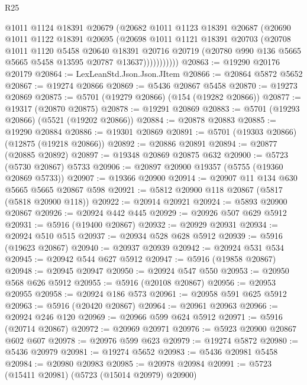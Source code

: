 \begin{lexlean}{R25}
\begin{coremodule}
                @1011
                @1124
                @18391
                @20679
                (@20682
                  @1011
                  @1123
                  @18391
                  @20687
                  (@20690
                    @1011
                    @1122
                    @18391
                    @20695
                    (@20698
                      @1011
                      @1121
                      @18391
                      @20703
                      (@20708
                        @1011
                        @1120
                        @5458
                        @20640
                        @18391
                        @20716
                        @20719
                        (@20780 @990 @136 @5665 @5665 @5458 @13595 @20787 @13637)))))))))))
@20863 := @19290 @20176 @20179
@20864 := LexLeanStd.Json.Json.JItem
@20866 := @20864 @5872 @5652
@20867 := @19274 @20866
@20869 := @5436 @20867 @5458
@20870 := @19273 @20869
@20875 := @5701 (@19279 @20866) (@154 (@19282 @20866))
@20877 := @19317 (@20870 @20875)
@20878 := @19291 @20869
@20883 := @5701 (@19293 @20866) (@5521 (@19202 @20866))
@20884 := @20878 @20883
@20885 := @19290 @20884
@20886 := @19301 @20869
@20891 := @5701 (@19303 @20866) (@12875 (@19218 @20866))
@20892 := @20886 @20891
@20894 := @20877 (@20885 @20892)
@20897 := @19348 @20869 @20875 @632
@20900 := @5723 (@5730 @20867) @5733
@20906 := @20897 @20900 @19357 (@5755 (@19360 @20869 @5733))
@20907 := @19366 @20900
@20914 := @20907 @11 @134 @630 @5665 @5665 @20867 @598
@20921 := @5812 @20900 @118 @20867 (@5817 (@5818 @20900 @118))
@20922 := @20914 @20921
@20924 := @5893 @20900 @20867
@20926 := @20924 @442 @445
@20929 := @20926 @507 @629 @5912
@20931 := @5916 (@19400 @20867)
@20932 := @20929 @20931
@20934 := @20924 @510 @515
@20937 := @20934 @528 @628 @5912
@20939 := @5916 (@19623 @20867)
@20940 := @20937 @20939
@20942 := @20924 @531 @534
@20945 := @20942 @544 @627 @5912
@20947 := @5916 (@19858 @20867)
@20948 := @20945 @20947
@20950 := @20924 @547 @550
@20953 := @20950 @568 @626 @5912
@20955 := @5916 (@20108 @20867)
@20956 := @20953 @20955
@20958 := @20924 @186 @573
@20961 := @20958 @591 @625 @5912
@20963 := @5916 (@20420 @20867)
@20964 := @20961 @20963
@20966 := @20924 @246 @120
@20969 := @20966 @599 @624 @5912
@20971 := @5916 (@20714 @20867)
@20972 := @20969 @20971
@20976 := @5923 @20900 @20867 @602 @607
@20978 := @20976 @599 @623
@20979 := @19274 @5872
@20980 := @5436 @20979
@20981 := @19274 @5652
@20983 := @5436 @20981 @5458
@20984 := @20980 @20983
@20985 := @20978 @20984
@20991 := @5723 (@15411 @20981) (@5723 (@15014 @20979) @20900)

\end{coremodule}
\end{lexlean}
